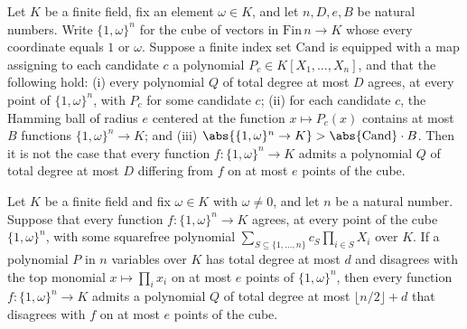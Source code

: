 \begin{theorem}
\label{RazborovSmolensky.rootCube_counting_obstruction}
\leanok
{}
Let $K$ be a finite field, fix an element $\omega \in K$, and let $n, D, e, B$ be
natural numbers. Write $\{1,\omega\}^n$ for the cube of vectors in $\mathrm{Fin}\,n \to
K$ whose every coordinate equals $1$ or $\omega$. Suppose a finite index set
$\mathrm{Cand}$ is equipped with a map assigning to each candidate $c$ a polynomial $P_c
\in K[X_1,\dots,X_n]$, and that the following hold: (i) every polynomial $Q$ of total
degree at most $D$ agrees, at every point of $\{1,\omega\}^n$, with $P_c$ for some
candidate $c$; (ii) for each candidate $c$, the Hamming ball of radius $e$ centered at
the function $x \mapsto P_c(x)$ contains at most $B$ functions $\{1,\omega\}^n \to K$;
and (iii) $\abs{\{1,\omega\}^n \to K} > \abs{\mathrm{Cand}}\cdot B$. Then it is not the
case that every function $f : \{1,\omega\}^n \to K$ admits a polynomial $Q$ of total
degree at most $D$ differing from $f$ on at most $e$ points of the cube.
\end{theorem}

\begin{theorem}
\label{RazborovSmolensky.rootProd_approx_implies_all_functions_approx}
\leanok
{}
Let $K$ be a finite field and fix $\omega \in K$ with $\omega \neq 0$, and let $n$ be a
natural number. Suppose that every function $f\colon \{1,\omega\}^n \to K$ agrees, at
every point of the cube $\{1,\omega\}^n$, with some squarefree polynomial $\sum_{S
\subseteq \{1,\dots,n\}} c_S \prod_{i \in S} X_i$ over $K$. If a polynomial $P$ in $n$
variables over $K$ has total degree at most $d$ and disagrees with the top monomial $x
\mapsto \prod_{i} x_i$ on at most $e$ points of $\{1,\omega\}^n$, then every function
$f\colon \{1,\omega\}^n \to K$ admits a polynomial $Q$ of total degree at most $\lfloor
n/2 \rfloor + d$ that disagrees with $f$ on at most $e$ points of the cube.
\end{theorem}

